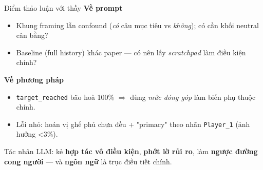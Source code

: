 \documentclass[aspectratio=169,11pt]{beamer}
\begin{document}
\begin{frame}{Điểm thảo luận với thầy}
  \textbf{Về prompt}
  \begin{itemize}
    \item Khung framing lẫn confound (\emph{có} câu mục tiêu vs \emph{không}); có cần khối neutral cân bằng?
    \item Baseline (full history) khác paper — có nên lấy \emph{scratchpad} làm điều kiện chính?
  \end{itemize}
  \textbf{Về phương pháp}
  \begin{itemize}
    \item \texttt{target\_reached} bão hoà 100\% $\Rightarrow$ dùng \emph{mức đóng góp} làm biến phụ thuộc chính.
    \item Lỗi nhỏ: hoán vị ghế phủ chưa đều + "primacy" theo nhãn \texttt{Player\_1} (ảnh hưởng <3\%).
  \end{itemize}
\end{frame}

\begin{frame}[standout]
  Tác nhân LLM: kẻ \textbf{hợp tác vô điều kiện}, \textbf{phớt lờ rủi ro}, làm \textbf{ngược đường cong người} — và \textbf{ngôn ngữ} là trục điều tiết chính.
\end{frame}
\end{document}
